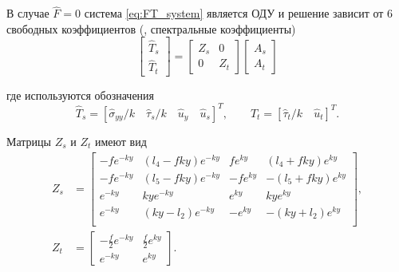 В случае $\hat{F} = 0$ система \eqref{eq:FT_system} является ОДУ и решение зависит от 6 свободных коэффициентов (\cite{Siebrits_Peirce_2002}, спектральные коэффициенты)
\begin{equation}
    \label{eq:fourier_solution}
    \left[
    \begin{array}{c}
        \hat{T}_s \\
        \hat{T}_t 
    \end{array}
    \right]
    =
    \left[
    \begin{array}{cc}
        Z_s & 0 \\
        0 & Z_t 
    \end{array}
    \right]
    \left[
    \begin{array}{c}
        A_s \\
        A_t 
    \end{array}
    \right]
\end{equation}

где используются обозначения
\begin{equation}
    \label{eq:FourierSeparateT}
    \hat{T}_s = \left[\hat{\sigma}_{yy}/k \quad \hat{\tau}_s/k \quad \hat{u}_y \quad \hat{u}_s \right]^T, \qquad 
    \hat{T}_t = \left[ \hat{\tau}_t/k \quad  \hat{u}_t \right]^T.
\end{equation}

Матрицы $Z_s$ и $Z_t$ имеют вид
\begin{equation}
    \label{eq:FourierSeparateA}
    \begin{split}
    Z_s & = 
    \left[
    \begin{array}{cccc}
        -fe^{-ky} & (l_4-fky)e^{-ky} & fe^{ky} & (l_4+fky)e^{ky} \\
        -fe^{-ky} & (l_5-fky)e^{-ky} & -fe^{ky} & -(l_5+fky)e^{ky} \\
        e^{-ky} & kye^{-ky} & e^{ky} & kye^{ky} \\
        e^{-ky} & (ky-l_2)e^{-ky} & -e^{ky} & -(ky+l_2)e^{ky} \\
    \end{array}
    \right],
    \\
    Z_t & = 
    \left[
    \begin{array}{cc}
        -\frac{f}{2}e^{-ky} & \frac{f}{2}e^{ky} \\
        e^{-ky} & e^{ky}
    \end{array}
    \right].
    \end{split}
\end{equation}

